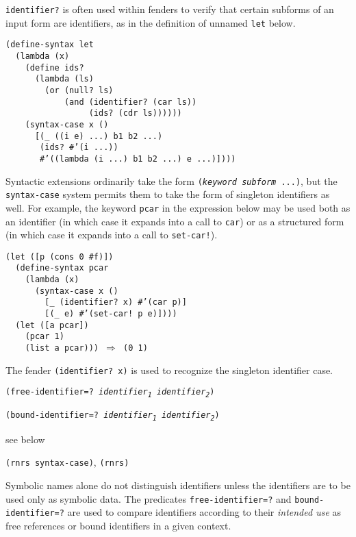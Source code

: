\texttt{identifier?} is often used within \label{syntax_s36}fenders to verify
that certain subforms of an input form are identifiers, as in the
definition of unnamed \texttt{let} below.

\begin{alltt}
(define-syntax let
  (lambda (x)
    (define ids?
      (lambda (ls)
        (or (null? ls)
            (and (identifier? (car ls))
                 (ids? (cdr ls))))))
    (syntax-case x ()
      [(\_{} ((i e) ...) b1 b2 ...)
       (ids? \#{}'(i ...))
       \#{}'((lambda (i ...) b1 b2 ...) e ...)])))
\end{alltt}


Syntactic extensions ordinarily take the form
\texttt{(\textit{keyword} \textit{subform} ...)}, but the
\texttt{syntax-case} system permits them to take the form of singleton
identifiers as well.
For example, the keyword \texttt{pcar} in the expression below may be used
both as an identifier (in which case it expands into a call to \texttt{car})
or as a structured form (in which case it expands
into a call to \texttt{set-car!}).


\begin{alltt}
(let ([p (cons 0 \#{}f)])
  (define-syntax pcar
    (lambda (x)
      (syntax-case x ()
        [\_{} (identifier? x) \#{}'(car p)]
        [(\_{} e) \#{}'(set-car! p e)])))
  (let ([a pcar])
    (pcar 1)
    (list a pcar))) \(\Rightarrow\) (0 1)
\end{alltt}


The fender \texttt{(identifier? x)} is used to recognize the singleton
identifier case.


\begin{description}

\label{syntax_s37}\item[procedure] \texttt{(free-identifier=? \textit{identifier\textsubscript{1}} \textit{identifier\textsubscript{2}})}



\item[procedure] \texttt{(bound-identifier=? \textit{identifier\textsubscript{1}} \textit{identifier\textsubscript{2}})}



\item[returns] see below


\item[libraries] \texttt{(rnrs syntax-case)}, \texttt{(rnrs)}
\end{description}


Symbolic names alone do not distinguish identifiers unless the
identifiers are to be used only as symbolic data.
The predicates \texttt{free-identifier=?} and \texttt{bound-identifier=?}
are used to compare identifiers according to their \textit{intended use}
as free references or bound identifiers in a given context.

